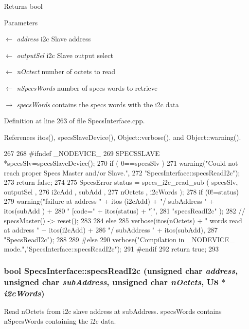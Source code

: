 \begin{DoxyReturn}{Returns}
bool 
\end{DoxyReturn}

\begin{DoxyParams}{Parameters}
\item[\mbox{$\leftarrow$} {\em address}]i2c Slave address \item[\mbox{$\leftarrow$} {\em outputSel}]i2c Slave output select \item[\mbox{$\leftarrow$} {\em nOctect}]number of octets to read \item[\mbox{$\leftarrow$} {\em nSpecsWords}]number of specs words to retrieve \item[\mbox{$\rightarrow$} {\em specsWords}]contains the specs words with the i2c data \end{DoxyParams}


Definition at line 263 of file SpecsInterface.cpp.

References itos(), specsSlaveDevice(), Object::verbose(), and Object::warning().


\begin{DoxyCode}
267                                              {
268 #ifndef _NODEVICE_
269   SPECSSLAVE *specsSlv=specsSlaveDevice();
270   if ( 0==specsSlv ){
271     warning("Could not reach proper Specs Master and/or Slave.",
272             "SpecsInterface::specsReadI2c");
273     return false;
274   }
275   SpecsError status = specs_i2c_read_sub ( specsSlv, outputSel ,
276                                            i2cAdd , subAdd , 
277                                            nOctets , i2cWords );
278   if (0!=status){
279     warning("failure at address " + itos (i2cAdd) + "/ subAddress " + itos(subAdd
      ) +
280             " [code=" + itos(status) + "]",
281             "specsReadI2c" );
282     //    specsMaster() -> reset();
283   }
284   else {
285     verbose(itos(nOctets) + " words read at address " + itos(i2cAdd) +
286             "/ subAddress " + itos(subAdd),
287             "SpecsReadI2c");
288   }
289 #else
290   verbose("Compilation in _NODEVICE_ mode.","SpecsInterface::specsReadI2c");
291 #endif
292   return true;
293 }
\end{DoxyCode}
\hypertarget{classSpecsInterface_acbc22fab91e3dbd33f83b324750baa1f}{
\subsubsection[{specsReadI2c}]{\setlength{\rightskip}{0pt plus 5cm}bool SpecsInterface::specsReadI2c (unsigned char {\em address}, \/  unsigned char {\em subAddress}, \/  unsigned char {\em nOctets}, \/  {\bf U8} $\ast$ {\em i2cWords})}}
\label{classSpecsInterface_acbc22fab91e3dbd33f83b324750baa1f}
Read nOctets from i2c slave address at subAddress. specsWords contains nSpecsWords containing the i2c data.

